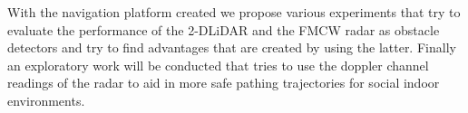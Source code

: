         \TEXT{}     
       {With the navigation platform created we propose various experiments that try to evaluate the performance of the   2-D\ac{LiDAR} and the \ac{FMCW} radar as obstacle detectors and try to find advantages that are created by using the latter. Finally an exploratory work will be conducted that tries to use the doppler channel readings of the \ac{radar} to aid in more safe pathing trajectories for social indoor environments.
        }
\EndTitlePage
\titlepage\ \endtitlepage %